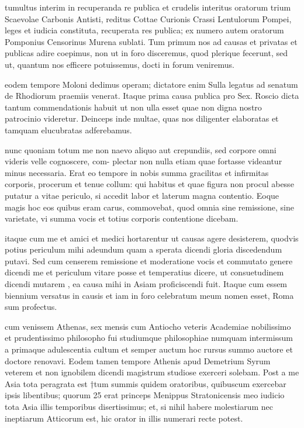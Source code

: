 tumultus interim in recuperanda re publica et crudelis interitus oratorum trium Scaevolae Carbonis Antisti, reditus Cottae Curionis Crassi Lentulorum Pompei, leges et iudicia constituta, recuperata res publica; ex numero autem oratorum Pomponius Censorinus Murena sublati. Tum primum nos ad causas et privatas et publicas adire coepimus, non ut in foro disceremus, quod plerique fecerunt, sed ut, quantum nos efficere potuissemus, docti in forum veniremus.

 eodem tempore Moloni dedimus operam; dictatore enim Sulla legatus ad senatum de Rhodiorum praemiis venerat. Itaque prima causa publica pro Sex. Roscio dicta tantum commendationis habuit ut non ulla esset quae non digna nostro patrocinio videretur. Deinceps inde multae, quas nos diligenter elaboratas et tamquam elucubratas adferebamus.

 nunc quoniam totum me non naevo aliquo aut crepundiis, sed corpore omni videris velle cognoscere, com- plectar non nulla etiam quae fortasse videantur minus necessaria. Erat eo tempore in nobis summa gracilitas et infirmitas corporis, procerum et tenue collum: qui habitus et quae figura non procul abesse putatur a vitae periculo, si accedit labor et laterum magna contentio. Eoque magis hoc eos quibus eram carus, commovebat, quod omnia sine remissione, sine varietate, vi summa vocis et totius corporis contentione dicebam.

 itaque cum me et amici et medici hortarentur ut causas agere desisterem, quodvis potius periculum mihi adeundum quam a sperata dicendi gloria discedendum putavi. Sed cum censerem remissione et moderatione vocis et commutato genere dicendi me et periculum vitare posse et temperatius dicere, ut consuetudinem dicendi mutarem , ea causa mihi in Asiam proficiscendi fuit. Itaque cum essem biennium versatus in causis et iam in foro celebratum meum nomen esset, Roma sum profectus.

 cum venissem Athenas, sex mensis cum Antiocho veteris Academiae nobilissimo et prudentissimo philosopho fui studiumque philosophiae numquam intermissum a primaque adulescentia cultum et semper auctum hoc rursus summo auctore et doctore renovavi. Eodem tamen tempore Athenis apud Demetrium Syrum veterem et non ignobilem dicendi magistrum studiose exerceri solebam. Post a me Asia tota peragrata est †tum summis quidem oratoribus, quibuscum exercebar ipsis libentibus; quorum 25 erat princeps Menippus Stratonicensis meo iudicio tota Asia illis temporibus disertissimus; et, si nihil habere molestiarum nec ineptiarum Atticorum est, hic orator in illis numerari recte potest.

